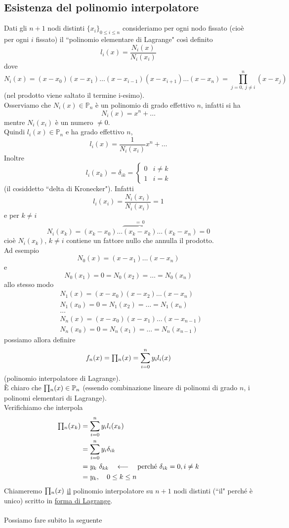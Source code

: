 \subsection{Esistenza del polinomio interpolatore}
Dati gli $n+1$ nodi distinti $\{ x_i \}_{0 \leq i \leq n}$ consideriamo per ogni nodo fissato (cioè per ogni $i$ fissato) il ``polinomio elementare di Lagrange" così definito
\[ l_i(x) = \frac{N_i(x)}{N_i(x_i)} \]
dove
\[ N_i(x) = (x-x_0)(x-x_1) \dotso (x-x_{i-1})(x-x_{i+1}) \dotso (x-x_n) = \prod_{j=0, \ j\neq i}^n (x-x_j) \]
(nel prodotto viene saltato il termine i-esimo).\\
Osserviamo che $N_i(x) \in \mathbb{P}_n$ è un polinomio di grado effettivo $n$, infatti si ha
\[ N_i(x)=x^n+\dotso \]
mentre $N_i(x_i)$ è un numero $\ne 0$.\\
Quindi $l_i(x) \in \mathbb{P}_n$ e ha grado effettivo $n$,
\[ l_i(x) = \frac{1}{N_i(x_i)}x^n+\dotso \]
Inoltre
\[ l_i(x_k) = \delta_{ik} =
\begin{cases}
0 & i\ne k \\
1 & i=k 
\end{cases} \]
(il cosiddetto ``delta di Kronecker"). Infatti
\[ l_i(x_i) = \frac{N_i(x_i)}{N_i(x_i)} = 1 \]
e per $k\ne i$
\[ N_i(x_k) = (x_k-x_0)\dotso \overbrace{(x_k-x_k)}^{=\,0} \dotso (x_k-x_n) = 0 \]
cioè $N_i (x_k)$,  $k \neq i$ contiene un fattore nullo che annulla il prodotto.\\
Ad esempio 
\[ N_0 (x) = (x-x_1) \dotso (x-x_n) \]
e 
\[ N_0(x_1) = 0 = N_0(x_2) = \dotso = N_0(x_n) \]
allo stesso modo
\[ \begin{split}
    & N_1(x) = (x-x_0)(x-x_2) \dotso (x-x_n) \\
    & N_1(x_0) = 0 = N_1(x_2) = \dotso = N_1(x_n) \\
    & \dotso \\
    & N_n(x) = (x-x_0)(x-x_1) \dotso (x-x_{n-1}) \\
    & N_n(x_0) = 0 = N_n(x_1) = \dotso = N_n(x_{n-1})
\end{split} \]
possiamo allora definire
\[ f_n(x) = \begin{matrix}\prod\end{matrix}_n(x) = \sum_{i=0}^n y_i l_i(x) \]
(polinomio interpolatore di Lagrange).\\
È chiaro che $\begin{matrix}\prod\end{matrix}_n(x) \in \mathbb{P}_n$ (essendo combinazione lineare di polinomi di grado $n$, i polinomi elementari di Lagrange).\\
Verifichiamo che interpola
\[ \begin{split}
    \begin{matrix}\prod\end{matrix}_n (x_k) & = \sum_{i=0}^n y_i l_i (x_k) \\
    & = \sum_{i=0}^n y_i \delta_{ik} \\
    & = y_k \ \delta_{kk} \quad \longleftarrow \quad \text{perché } \delta_{ik}=0, i \ne k\\
    & = y_k, \quad 0 \leq k \leq n
\end{split} \]
Chiameremo $\begin{matrix}\prod\end{matrix}_n(x)$ \uline{il} polinomio interpolatore su $n+1$ nodi distinti (``il" perché è unico) scritto in \uline{forma di Lagrange}.\\\\
Possiamo fare subito la seguente 


